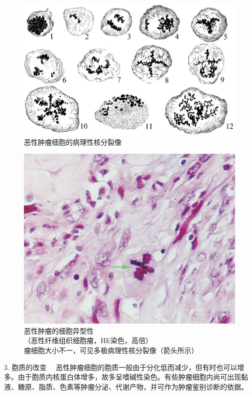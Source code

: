 \begin{figure}[!htbp]
 \centering
 \includegraphics{./images/Image00070.jpg}
 \caption{恶性肿瘤细胞的病理性核分裂像}
 \label{fig5-3}
  \end{figure}

\begin{figure}[!htbp]
 \centering
 \includegraphics{./images/Image00071.jpg}
 \captionsetup{justification=centering}
 \caption{恶性肿瘤的细胞异型性\\{\small （恶性纤维组织细胞瘤，HE染色，高倍）\\
 瘤细胞大小不一，可见多极病理性核分裂像（箭头所示）}}
\label{fig5-4}
  \end{figure}



{3. 胞质的改变}
　恶性肿瘤细胞的胞质一般由于分化低而减少，但有时也可以增多。由于胞质内核蛋白体增多，故多呈嗜碱性染色。有些肿瘤细胞内尚可出现黏液、糖原、脂质、色素等肿瘤分泌、代谢产物，并可作为肿瘤鉴别诊断的依据。


